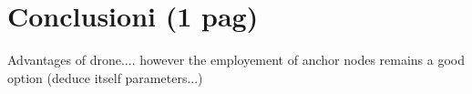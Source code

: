 \documentclass[12pt,twoside]{report}
\begin{document}
\chapter{Conclusioni (1 pag)}
Advantages of drone.... however the employement of anchor nodes remains a good option (deduce itself parameters...)








\clearpage
\printbibliography[
heading=bibintoc,
title={Whole bibliography}
]


\end{document}
